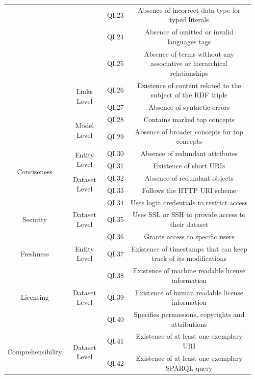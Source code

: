 \documentclass[onecolumn, crcready]{iosart2c}
\begin{document}
\begin{landscape}
\begin{center}
{\begin{longtable}[h]{|c|c|c|c|}
\cline{3-4} 
 &  & QI.23 & Absence of incorrect data type for typed literals \cite{Hogan2010}\cite{Acosta2013} \tabularnewline
\cline{3-4} 
 &  & QI.24 & Absence of omitted or invalid languages tags \cite{Suominen:2012:IQS:2413941.2413985}\cite{Mader2012}\tabularnewline
\cline{3-4} 
 &  & QI.25 & Absence of terms without any associative or hierarchical relationships \cite{journals/ires/Living10}\tabularnewline
\cline{2-4} 
 & \multirow{2}{*}{Links Level} & QI.26 & Existence of content related to the subject of the RDF triple \cite{Suominen:2012:IQS:2413941.2413985}\cite{Acosta2013}\tabularnewline
\cline{3-4} 
 &  & QI.27 & Absence of syntactic errors  \cite{Suominen2013}\tabularnewline
\cline{2-4} 
 & \multirow{2}{*}{Model Level} & QI.28 & Contains marked top concepts \cite{Mader2012}\tabularnewline
\cline{3-4} 
 &  & QI.29 & Absence of broader concepts for top concepts \cite{Mader2012}\tabularnewline
\hline 
\hline 
\multirow{4}{*}{Conciseness} & \multirow{2}{*}{Entity Level} & QI.30 & Absence of redundant attributes \cite{Mendes2012}\tabularnewline
\cline{3-4} 
 &  & QI.31 & Existence of short URIs \cite{Framework2012}\tabularnewline
\cline{2-4} 
 & \multirow{2}{*}{Dataset Level} & QI.32 & Absence of redundant objects \cite{Mendes2012}\tabularnewline
\cline{3-4} 
 &  & QI.33 & Follows the HTTP URI scheme \cite{Hogan:2012:ESL:2263498.2264570}\cite{Suominen2013}\tabularnewline
\hline  
\hline 
\multirow{3}{*}{Security} & \multirow{3}{*}{Dataset Level} & QI.34 & Uses login credentials to restrict access \cite{Framework2012}\tabularnewline
\cline{3-4} 
 &  & QI.35 & Uses SSL or SSH to provide access to their dataset \cite{Framework2012}\tabularnewline
\cline{3-4} 
 &  & QI.36 & Grants access to specific users \cite{Framework2012}\tabularnewline
\hline 
\hline 
\multirow{1}{*}{Freshness} & \multirow{1}{*}{Entity Level} & QI.37 & Existence of timestamps that can keep track of its modifications  \cite{Flouris2012}\tabularnewline
\hline 
\hline 
\multirow{3}{*}{Licensing} & \multirow{3}{*}{Dataset Level} & QI.38 & Existence of machine readable license information \cite{Hogan:2012:ESL:2263498.2264570}\tabularnewline
\cline{3-4} 
 &  & QI.39 & Existence of human readable license information  \cite{Hogan:2012:ESL:2263498.2264570}\tabularnewline
\cline{3-4} 
 &  & QI.40 & Specifies permissions, copyrights and attributions  \cite{Framework2012}\tabularnewline
\hline 
\hline 
\multirow{5}{*}{Comprehensibility} & \multirow{5}{*}{Dataset Level} & QI.41 & Existence of at least one exemplary URI \cite{Framework2012}\tabularnewline
\cline{3-4} 
 &  & QI.42 & Existence of at least one exemplary SPARQL query \cite{Framework2012}\tabularnewline

\end{longtable}}
\end{center}
\end{landscape}
\end{document}
